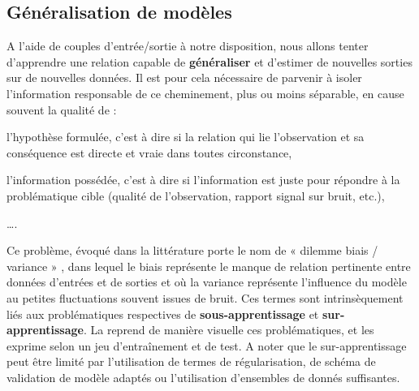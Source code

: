 \subsection{Généralisation de modèles}
\label{subsec:generalized_models}
A l'aide de couples d'entrée/sortie à notre disposition, nous allons tenter d’apprendre une relation capable de \textbf{généraliser} et d’estimer de nouvelles sorties sur de nouvelles données. Il est pour cela nécessaire de parvenir à isoler l'information responsable de ce cheminement, plus ou moins séparable, en cause souvent la qualité de :
\begin{inlinerate}
    \item l'hypothèse formulée, c'est à dire si la relation qui lie l'observation et sa conséquence est directe et vraie dans toutes circonstance,
    \item l'information possédée, c'est à dire si l'information est juste pour répondre à la problématique cible (qualité de l'observation, rapport signal sur bruit, etc.),
    \item \ldots.
\end{inlinerate}\par 

Ce problème, évoqué dans la littérature porte le nom de « dilemme biais / variance » , dans lequel le biais représente le manque de relation pertinente entre données d’entrées et de sorties et où la variance représente l’influence du modèle au petites fluctuations souvent issues de bruit. Ces termes sont intrinsèquement liés aux problématiques respectives de \textbf{sous-apprentissage} et \textbf{sur-apprentissage}. La  reprend de manière visuelle ces problématiques, et les exprime selon un jeu d’entraînement et de test. A noter que le sur-apprentissage peut être limité par l’utilisation de termes de régularisation, de schéma de validation de modèle adaptés ou l’utilisation d’ensembles de donnés suffisantes.\par
 
